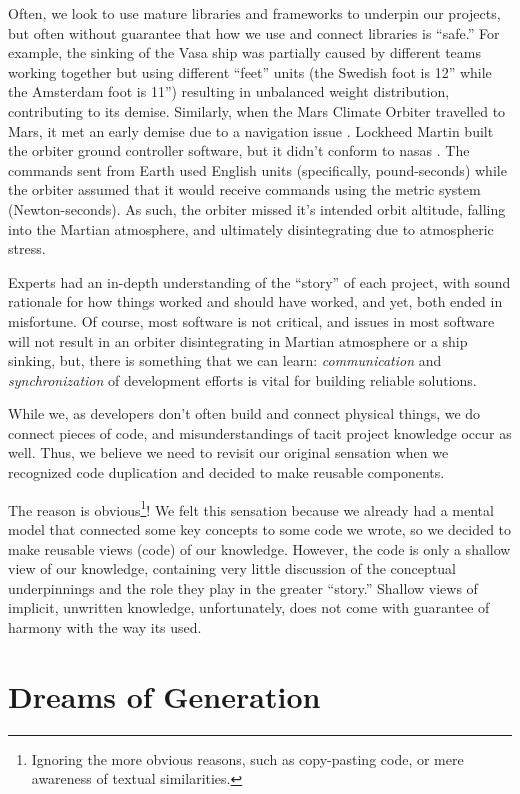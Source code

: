 Often, we look to use mature libraries and frameworks to underpin our projects,
but often without guarantee that how we use and connect libraries is ``safe.''
For example, the sinking of the Vasa ship \cite{wiki:Vasa_ship} was partially
caused by different teams working together but using different ``feet'' units
(the Swedish foot is 12'' while the Amsterdam foot is 11'') resulting in
unbalanced weight distribution, contributing to its demise. Similarly, when the
Mars Climate Orbiter travelled to Mars, it met an early demise due to a
navigation issue \cite{Siddiqi2018}. Lockheed Martin built the orbiter ground
controller software, but it didn't conform to \acsp{nasa} . The
commands sent from Earth used English units (specifically, pound-seconds) while
the orbiter assumed that it would receive commands using the metric system
(Newton-seconds). As such, the orbiter missed it's intended orbit altitude,
falling into the Martian atmosphere, and ultimately disintegrating due to
atmospheric stress.

Experts had an in-depth understanding of the ``story'' of each project, with
sound rationale for how things worked and should have worked, and yet, both
ended in misfortune. Of course, most software is not critical, and issues in
most software will not result in an orbiter disintegrating in Martian atmosphere
or a ship sinking, but, there is something that we can learn:
\textit{communication} and \textit{synchronization} of development efforts is
vital for building reliable solutions.

While we, as developers don't often build and connect physical things, we do
connect pieces of code, and misunderstandings of tacit project knowledge occur
as well. Thus, we believe we need to revisit our original sensation when we
recognized code duplication and decided to make reusable components.

The reason is obvious\footnote{Ignoring the more obvious reasons, such as
copy-pasting code, or mere awareness of textual similarities.}! We felt this
sensation because we already had a mental model that connected some key concepts
to some code we wrote, so we decided to make reusable views (code) of our
knowledge. However, the code is only a shallow view of our knowledge, containing
very little discussion of the conceptual underpinnings and the role they play in
the greater ``story.'' Shallow views of implicit, unwritten knowledge,
unfortunately, does not come with guarantee of harmony with the way its used.

\section{Dreams of Generation}
\label{chap:ideology:sec:thoughts_of_generation}

